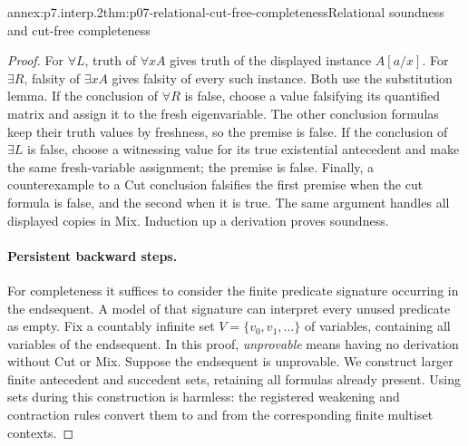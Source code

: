 \begin{annexitem}{annex:p7.interp.2}{thm:p07-relational-cut-free-completeness}{Relational soundness and cut-free completeness}
\begin{proof}
For \(\forall L\), truth of \(\forall xA\) gives truth of the displayed
instance \(A[a/x]\).  For \(\exists R\), falsity of \(\exists xA\)
gives falsity of every such instance.  Both use the substitution lemma.
If the conclusion of \(\forall R\) is false, choose a value falsifying
its quantified matrix and assign it to the fresh eigenvariable.
The other conclusion formulas keep their truth values by freshness,
so the premise is false.  If the conclusion of \(\exists L\) is false,
choose a witnessing value for its true existential antecedent and make
the same fresh-variable assignment; the premise is false.
Finally, a counterexample to a Cut conclusion falsifies the first
premise when the cut formula is false, and the second when it is true.
The same argument handles all displayed copies in Mix.
Induction up a derivation proves soundness.

\paragraph{Persistent backward steps.}
For completeness it suffices to consider the finite predicate signature
occurring in the endsequent.  A model of that signature can interpret
every unused predicate as empty.  Fix a countably infinite set
\(V=\{v_0,v_1,\ldots\}\) of variables, containing all variables of the
endsequent.
In this proof, \emph{unprovable} means having no derivation without Cut or Mix.
Suppose the endsequent is unprovable.
We construct larger finite antecedent and succedent sets, retaining all
formulas already present.  Using sets during this construction is harmless:
the registered weakening and contraction rules convert them to and from
the corresponding finite multiset contexts.


\end{proof}
\end{annexitem}
